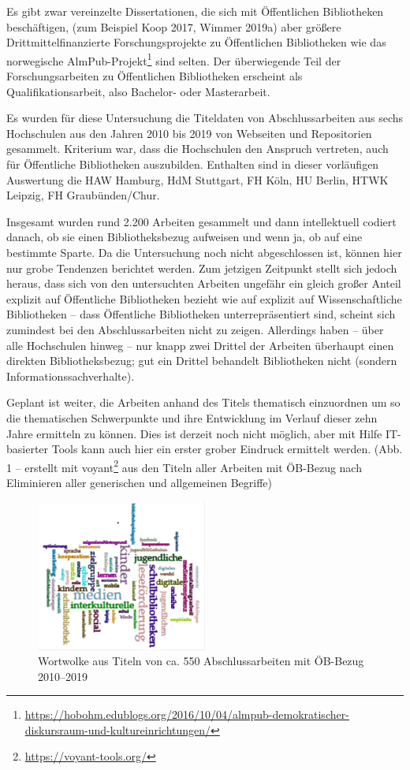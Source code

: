 \documentclass[a4paper,
fontsize=11pt,
oneside,
numbers=noperiodatend,
parskip=half-,
bibliography=totoc,
final
]{scrartcl}
\begin{document}
Es gibt zwar vereinzelte Dissertationen, die sich mit Öffentlichen
Bibliotheken beschäftigen, (zum Beispiel Koop 2017, Wimmer 2019a) aber
größere Drittmittelfinanzierte Forschungsprojekte zu Öffentlichen
Bibliotheken wie das norwegische AlmPub-Projekt\footnote{\url{https://hobohm.edublogs.org/2016/10/04/almpub-demokratischer-diskursraum-und-kultureinrichtungen/}}
sind selten. Der überwiegende Teil der Forschungsarbeiten zu
Öffentlichen Bibliotheken erscheint als Qualifikationsarbeit, also
Bachelor- oder Masterarbeit.

Es wurden für diese Untersuchung die Titeldaten von Abschlussarbeiten
aus sechs Hochschulen aus den Jahren 2010 bis 2019 von Webseiten und
Repositorien gesammelt. Kriterium war, dass die Hochschulen den Anspruch
vertreten, auch für Öffentliche Bibliotheken auszubilden. Enthalten sind
in dieser vorläufigen Auswertung die HAW Hamburg, HdM Stuttgart, FH
Köln, HU Berlin, HTWK Leipzig, FH Graubünden/Chur.

Insgesamt wurden rund 2.200 Arbeiten gesammelt und dann intellektuell
codiert danach, ob sie einen Bibliotheksbezug aufweisen und wenn ja, ob
auf eine bestimmte Sparte. Da die Untersuchung noch nicht abgeschlossen
ist, können hier nur grobe Tendenzen berichtet werden. Zum jetzigen
Zeitpunkt stellt sich jedoch heraus, dass sich von den untersuchten
Arbeiten ungefähr ein gleich großer Anteil explizit auf Öffentliche
Bibliotheken bezieht wie auf explizit auf Wissenschaftliche Bibliotheken
-- dass Öffentliche Bibliotheken unterrepräsentiert sind, scheint sich
zumindest bei den Abschlussarbeiten nicht zu zeigen. Allerdings haben --
über alle Hochschulen hinweg -- nur knapp zwei Drittel der Arbeiten
überhaupt einen direkten Bibliotheksbezug; gut ein Drittel behandelt
Bibliotheken nicht (sondern Informationssachverhalte).

Geplant ist weiter, die Arbeiten anhand des Titels thematisch
einzuordnen um so die thematischen Schwerpunkte und ihre Entwicklung im
Verlauf dieser zehn Jahre ermitteln zu können. Dies ist derzeit noch
nicht möglich, aber mit Hilfe IT-basierter Tools kann auch hier ein
erster grober Eindruck ermittelt werden. (Abb. 1 -- erstellt mit
voyant\footnote{\url{https://voyant-tools.org/}} aus den Titeln aller
Arbeiten mit ÖB-Bezug nach Eliminieren aller generischen und allgemeinen
Begriffe)

\begin{figure}
\centering
\includegraphics[width=0.5\textwidth]{img/image1.png}
\caption{Wortwolke aus Titeln von ca. 550 Abschlussarbeiten mit ÖB-Bezug
2010--2019}
\end{figure}
\end{document}
